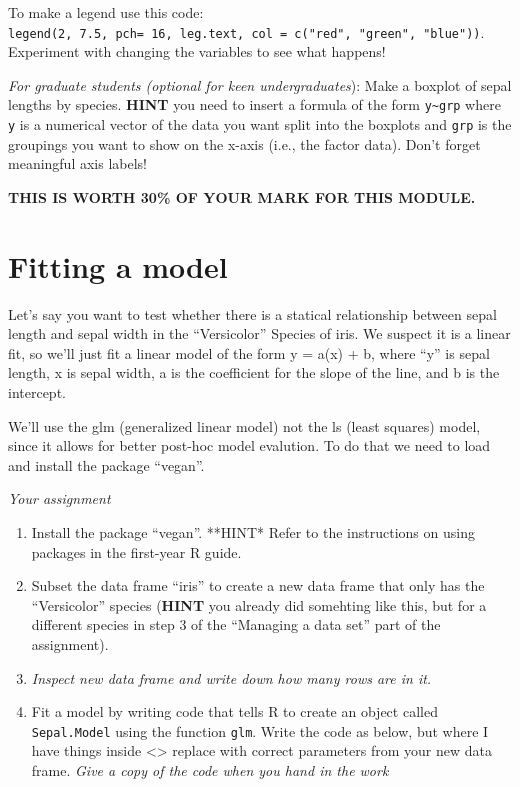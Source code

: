 \documentclass[]{book}
\begin{document}
To make a legend use this code: \texttt{legend(2,\ 7.5,\ pch=\ 16,\ leg.text,\ col\ =\ c("red",\ "green",\ "blue"))}. Experiment with changing the variables to see what happens!

\emph{For graduate students (optional for keen undergraduates}): Make a boxplot of sepal lengths by species. \textbf{HINT} you need to insert a formula of the form \texttt{y\textasciitilde{}grp} where \texttt{y} is a numerical vector of the data you want split into the boxplots and \texttt{grp} is the groupings you want to show on the x-axis (i.e., the factor data). Don't forget meaningful axis labels!

\textbf{THIS IS WORTH 30\% OF YOUR MARK FOR THIS MODULE.}

\hypertarget{fitting-a-model}{%
\chapter{Fitting a model}\label{fitting-a-model}}

Let's say you want to test whether there is a statical relationship between sepal length and sepal width in the ``Versicolor'' Species of iris. We suspect it is a linear fit, so we'll just fit a linear model of the form y = a(x) + b, where ``y'' is sepal length, x is sepal width, a is the coefficient for the slope of the line, and b is the intercept.

We'll use the glm (generalized linear model) not the ls (least squares) model, since it allows for better post-hoc model evalution. To do that we need to load and install the package ``vegan''.

\emph{Your assignment}

\begin{enumerate}
\def\labelenumi{\arabic{enumi}.}
\item
  Install the package ``vegan''. **HINT* Refer to the instructions on using packages in the first-year R guide.
\item
  Subset the data frame ``iris'' to create a new data frame that only has the ``Versicolor'' species (\textbf{HINT} you already did somehting like this, but for a different species in step 3 of the ``Managing a data set'' part of the assignment).
\item
  \emph{Inspect new data frame and write down how many rows are in it.}
\item
  Fit a model by writing code that tells R to create an object called \texttt{Sepal.Model} using the function \texttt{glm}. Write the code as below, but where I have things inside \textless{}\textgreater{} replace with correct parameters from your new data frame. \emph{Give a copy of the code when you hand in the work}
\end{enumerate}
\end{document}
